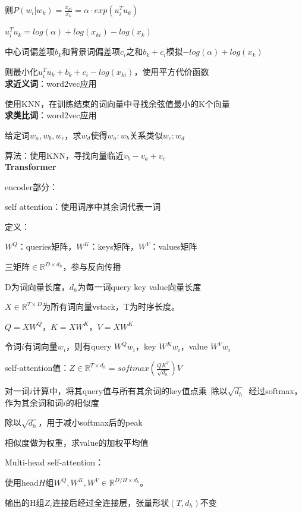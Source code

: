 \documentclass[UTF8]{ctexart}
\begin{document}
  \quad 则$P(w_i | w_k) = \frac{x_{ki}}{x_k} = \alpha \cdot exp(u_i^Tu_k)$

  \quad \quad $u_i^Tu_k = log(\alpha) + log(x_{ki}) - log(x_k)$

  \quad 中心词偏差项$b_k$和背景词偏差项$c_i$之和$b_k + c_i$模拟$-log(\alpha) + log(x_k)$

  \quad 则最小化$u_i^Tu_k + b_k + c_i - log(x_{ki})$，使用平方代价函数\\
\textbf{求近义词}：word2vec应用

  使用KNN，在训练结束的词向量中寻找余弦值最小的K个向量\\
\textbf{求类比词}：word2vec应用

  给定词$w_a, w_b, w_c$，求$w_d$使得$w_a : w_b$关系类似$w_c:w_d$

  算法：使用KNN，寻找向量临近$v_b - v_a + v_c$\\
\textbf{Transformer}

  encoder部分：

  \quad self attention：使用词序中其余词代表一词

  \quad \quad 定义：

  \quad \quad \quad $W^Q$：queries矩阵，$W^K$：keys矩阵，$W^V$：values矩阵

  \quad \quad \quad \quad 三矩阵$\in \mathbb{R}^{D \times d_h}$，参与反向传播

  \quad \quad \quad \quad D为词向量长度，$d_h$为每一词query key value向量长度

  \quad \quad \quad $X \in \mathbb{R}^{T \times D}$为所有词向量vstack，T为时序长度。
  
  \quad \quad \quad $Q = XW^Q$，$K = XW^K$，$V = XW^K$
  
  \quad \quad \quad 令词$i$有词向量$w_i$，则有query $W^Qw_i$，key $W^Kw_i$，value $W^Vw_i$

  \quad \quad self-attention值：$Z \in \mathbb{R}^{T \times d_h}= softmax(\frac{QK^T}{\sqrt{d_h}}) V$

  \quad \quad \quad 对一词$i$计算中，将其query值与所有其余词的key值点乘\ 除以$\sqrt{d_h}$\ 经过softmax，作为其余词和词$i$的相似度

  \quad \quad \quad 除以$\sqrt{d_h}$，用于减小softmax后的peak

  \quad \quad \quad 相似度做为权重，求value的加权平均值

  \quad Multi-head self-attention：

  \quad \quad 使用head$H$组$W^Q, W^K, W^V \in \mathbb{R}^{D / H \times d_h}$。

  \quad \quad 输出的H组$Z_i$连接后经过全连接层，张量形状$(T, d_h)$不变
\end{document}
